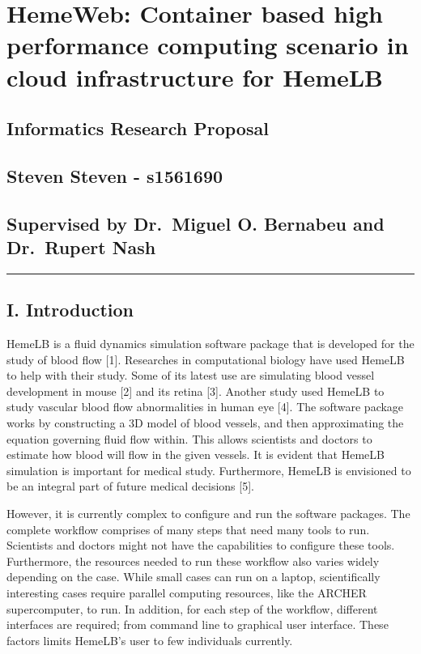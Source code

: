 \documentclass[]{article}
\date{}
\begin{document}
\section{HemeWeb: Container based high performance computing scenario in
cloud infrastructure for
HemeLB}\label{hemeweb-container-based-high-performance-computing-scenario-in-cloud-infrastructure-for-hemelb}

\subsection{Informatics Research
Proposal}\label{informatics-research-proposal}

\subsection{Steven Steven - s1561690}\label{steven-steven---s1561690}

\subsection{Supervised by Dr.~Miguel O. Bernabeu and Dr.~Rupert
Nash}\label{supervised-by-dr.miguel-o.-bernabeu-and-dr.rupert-nash}

\begin{center}\rule{0.5\linewidth}{\linethickness}\end{center}

\subsection{I. Introduction}\label{i.-introduction}

HemeLB is a fluid dynamics simulation software package that is developed
for the study of blood flow {[}1{]}. Researches in computational biology
have used HemeLB to help with their study. Some of its latest use are
simulating blood vessel development in mouse {[}2{]} and its retina
{[}3{]}. Another study used HemeLB to study vascular blood flow
abnormalities in human eye {[}4{]}. The software package works by
constructing a 3D model of blood vessels, and then approximating the
equation governing fluid flow within. This allows scientists and doctors
to estimate how blood will flow in the given vessels. It is evident that
HemeLB simulation is important for medical study. Furthermore, HemeLB is
envisioned to be an integral part of future medical decisions {[}5{]}.

However, it is currently complex to configure and run the software
packages. The complete workflow comprises of many steps that need many
tools to run. Scientists and doctors might not have the capabilities to
configure these tools. Furthermore, the resources needed to run these
workflow also varies widely depending on the case. While small cases can
run on a laptop, scientifically interesting cases require parallel
computing resources, like the ARCHER supercomputer, to run. In addition,
for each step of the workflow, different interfaces are required; from
command line to graphical user interface. These factors limits HemeLB's
user to few individuals currently.
\end{document}
